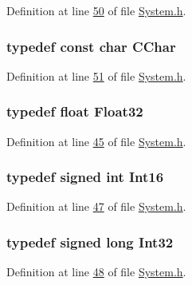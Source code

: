 Definition at line \hyperlink{a00072_source_l00050}{50} of file \hyperlink{a00072_source}{System.\+h}.

\hypertarget{a00072_ab151ad5c5a3b673cb8815c87ed7f706c}{
\subsubsection[{C\+Char}]{\setlength{\rightskip}{0pt plus 5cm}typedef const char {\bf C\+Char}}}\label{a00072_ab151ad5c5a3b673cb8815c87ed7f706c}


Definition at line \hyperlink{a00072_source_l00051}{51} of file \hyperlink{a00072_source}{System.\+h}.

\hypertarget{a00072_a87d38f886e617ced2698fc55afa07637}{
\subsubsection[{Float32}]{\setlength{\rightskip}{0pt plus 5cm}typedef float {\bf Float32}}}\label{a00072_a87d38f886e617ced2698fc55afa07637}


Definition at line \hyperlink{a00072_source_l00045}{45} of file \hyperlink{a00072_source}{System.\+h}.

\hypertarget{a00072_a659ce9e5eb6571f9984ffc7caad2660a}{
\subsubsection[{Int16}]{\setlength{\rightskip}{0pt plus 5cm}typedef signed int {\bf Int16}}}\label{a00072_a659ce9e5eb6571f9984ffc7caad2660a}


Definition at line \hyperlink{a00072_source_l00047}{47} of file \hyperlink{a00072_source}{System.\+h}.

\hypertarget{a00072_a184d0ff2424cf4b81c68ce9538481a04}{
\subsubsection[{Int32}]{\setlength{\rightskip}{0pt plus 5cm}typedef signed long {\bf Int32}}}\label{a00072_a184d0ff2424cf4b81c68ce9538481a04}


Definition at line \hyperlink{a00072_source_l00048}{48} of file \hyperlink{a00072_source}{System.\+h}.

